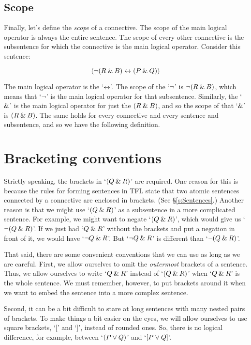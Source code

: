 \subsection{Scope}

Finally, let's define the \emph{scope} of a connective. The scope of the main logical operator is always the entire sentence. The scope of every other connective is the subsentence for which the connective is the main logical operator. Consider this sentence:

$$({\neg}(R \mathbin{\&} B) \leftrightarrow (P \mathbin{\&} Q))$$

The main logical operator is the `$\leftrightarrow$'. The scope of the `${\neg}$' is ${\neg}(R \mathbin{\&} B)$, which means that `${\neg}$' is the main logical operator for that subsentence. Similarly, the `$\mathbin{\&}$' is the main logical operator for just the $(R \mathbin{\&} B)$, and so the scope of that `$\mathbin{\&}$' is $(R \mathbin{\&} B)$. The same holds for every connective and every sentence and subsentence, and so we have the following definition.



\section{Bracketing conventions}
\label{TFLconventions}
Strictly speaking, the brackets in `$(Q \mathbin{\&} R)$' are required. One reason for this is because the rules for forming sentences in TFL state that two atomic sentences connected by a connective are enclosed in brackets. (See \S\ref{s:Sentences}.) Another reason is that we might use `$(Q \mathbin{\&} R)$' as a subsentence in a more complicated sentence. For example, we might want to negate `$(Q \mathbin{\&} R)$', which would give us `${\neg}(Q \mathbin{\&} R)$'. If we just had `$Q \mathbin{\&} R$' without the brackets and put a negation in front of it, we would have `${\neg} Q \mathbin{\&} R$'. But `${\neg} Q \mathbin{\&} R$' is different than `${\neg}(Q\mathbin{\&} R)$'. 

That said, there are some convenient conventions that we can use as long as we are careful. First,  we allow ourselves to omit the \emph{outermost} brackets of a sentence. Thus, we allow ourselves to write `$Q \mathbin{\&} R$' instead of `$(Q \mathbin{\&} R)$' when `$Q \mathbin{\&} R$' is the whole sentence. We must remember, however, to put brackets around it when we want to embed the sentence into a more complex sentence.

Second, it can be a bit difficult to stare at long sentences with many nested pairs of brackets. To make things a bit easier on the eyes, we will allow ourselves to use square brackets, `[' and `]', instead of rounded ones. So, there is no logical difference, for example, between `$(P\vee Q)$' and `$[P\vee Q]$'. 

